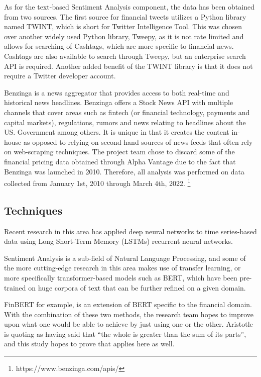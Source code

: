 \documentclass{llncs}
\begin{document}
As for the text-based Sentiment Analysis component, the data has been obtained from two sources.  The first source for financial tweets utilizes a Python library named TWINT, which is short for Twitter Intelligence Tool.   This was chosen over another widely used Python library, Tweepy, as it is not rate limited and allows for searching of Cashtags, which are more specific to financial news.  Cashtags are also available to search through Tweepy, but an enterprise search API is required.  Another added benefit of the TWINT library is that it does not require a Twitter developer account.

Benzinga is a news aggregator that provides access to both real-time and historical news headlines.  Benzinga offers a Stock News API with multiple channels that cover areas such as fintech (or financial technology, payments and capital markets), regulations, rumors and news relating to headlines about the US. Government among others.  It is unique in that it creates the content in-house as opposed to relying on second-hand sources of news feeds that often rely on web-scraping techniques.  The project team chose to discard some of the financial pricing data obtained through Alpha Vantage due to the fact that Benzinga was launched in 2010.  Therefore, all analysis was performed on data collected from January 1st, 2010 through March 4th, 2022.  
\footnote{https://www.benzinga.com/apis/}

\subsection{Techniques}

Recent research in this area has applied deep neural networks to time series-based data using Long Short-Term Memory (LSTMs) recurrent neural networks.

Sentiment Analysis is a sub-field of Natural Language Processing, and some of the more cutting-edge research in this area makes use of transfer learning, or more specifically transformer-based models such as BERT, which have been pre-trained on huge corpora of text that can be further refined on a given domain.

FinBERT for example, is an extension of BERT specific to the financial domain.
With the combination of these two methods, the research team hopes to improve upon what one would be able to achieve by just using one or the other. Aristotle is quoting as having said that “the whole is greater than the sum of its parts”, and this study hopes to prove that applies here as well.
\end{document}
